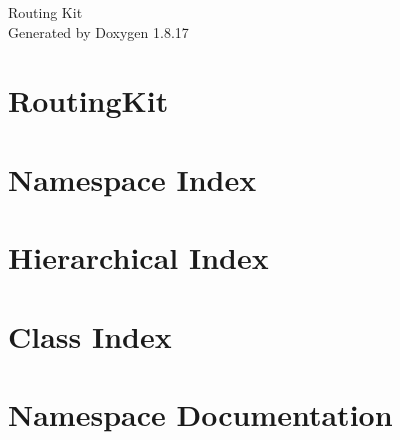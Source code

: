 \let\mypdfximage\pdfximage\def\pdfximage{\immediate\mypdfximage}\documentclass[twoside]{book}
\newcommand{\+}{\discretionary{\mbox{\scriptsize$\hookleftarrow$}}{}{}}
\newcommand{\clearemptydoublepage}{%
  \newpage{\pagestyle{empty}\cleardoublepage}%
}
\begin{document}
\hypersetup{pageanchor=false,
             bookmarksnumbered=true,
             pdfencoding=unicode
            }
\begin{titlepage}
\vspace*{7cm}
\begin{center}%
{\Large Routing Kit }\\
\vspace*{1cm}
{\large Generated by Doxygen 1.8.17}\\
\end{center}
\end{titlepage}
\clearemptydoublepage
{}
\tableofcontents
\clearemptydoublepage
{}
\hypersetup{pageanchor=true}

\chapter{Routing\+Kit}
\label{index}\hypertarget{index}{}
\chapter{Namespace Index}

\chapter{Hierarchical Index}

\chapter{Class Index}

\chapter{Namespace Documentation}

\end{document}
